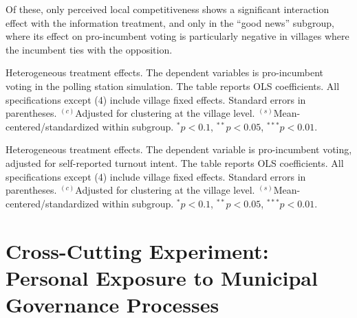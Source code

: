 \documentclass[11pt]{article}
\begin{document}
Of these, only perceived local competitiveness shows a significant interaction effect with the information treatment, and only in the ``good news'' subgroup, where its effect on pro-incumbent voting is particularly negative in villages where the incumbent ties with the opposition. 

\begin{table}

\caption{Heterogeneous treatment effects. The dependent variables is pro-incumbent voting in the polling station simulation. The table reports OLS coefficients. All specifications except (4) include village fixed effects. Standard errors in parentheses. $^{(c)}$Adjusted for clustering at the village level. $^{(s)}$Mean-centered/standardized within subgroup. $^{*} p<0.1$, $^{**} p<0.05$, $^{***} p<0.01$. }
\label{TableHeterogeneity1}
\end{table}


\begin{table}

\caption{Heterogeneous treatment effects. The dependent variable is pro-incumbent voting, adjusted for self-reported turnout intent. The table reports OLS coefficients. All specifications except (4) include village fixed effects. Standard errors in parentheses. $^{(c)}$Adjusted for clustering at the village level. $^{(s)}$Mean-centered/standardized within subgroup. $^{*} p<0.1$, $^{**} p<0.05$, $^{***} p<0.01$. }
\label{TableHeterogeneity2}
\end{table}

\section{Cross-Cutting Experiment: Personal Exposure to Municipal Governance Processes}
\end{document}
